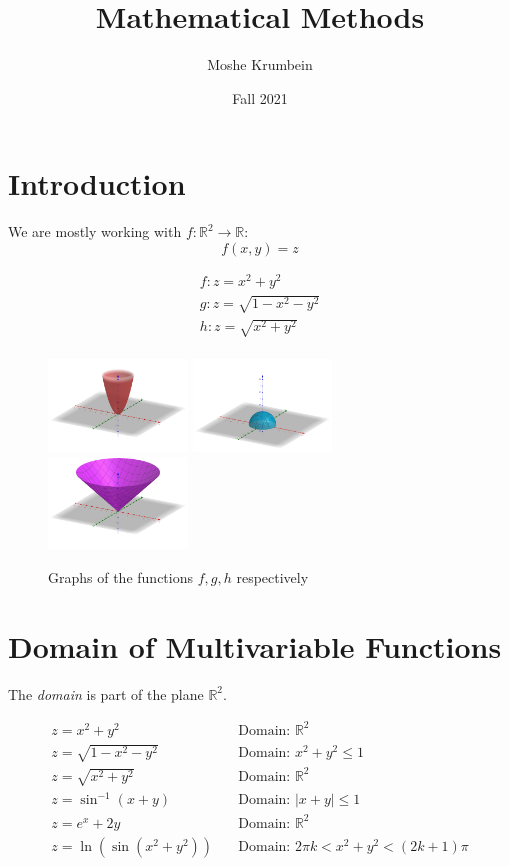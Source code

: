 \documentclass[00_complete]{subfiles}
\title{Mathematical Methods}
\author{Moshe Krumbein}
\date{Fall 2021}
\begin{document}

\section{Introduction}
We are mostly working with $f: \mathbb{R}^2 \to \mathbb{R}$:
$$f(x,y) = z$$
\begin{example}
    \begin{gather*}
     f: z=x^2+y^2 \\
     g: z=\sqrt{1-x^2-y^2} \\
     h: z=\sqrt{x^2+y^2} \\
    \end{gather*}
    \begin{figure}[ht]
    \includegraphics[width=0.33\textwidth]{w10_f}
    \includegraphics[width=0.33\textwidth]{w10_g}
    \includegraphics[width=0.33\textwidth]{w10_h}
    \caption{Graphs of the functions $f,g,h$ respectively}
    \end{figure}
    \label{cone}
\end{example}
\section{Domain of Multivariable Functions}
The \emph{domain} is part of the plane $\mathbb{R}^2$.
\begin{example}
    \begin{align*}
        z=x^2+y^2 &\quad \text{Domain: } \mathbb{R}^2 \\
        z=\sqrt{1-x^2-y^2} &\quad \text{Domain: } x^2+y^2\leq 1 \\
        z=\sqrt{x^2+y^2} &\quad \text{Domain: } \mathbb{R}^2 \\
        z=\sin^{-1}(x+y) &\quad \text{Domain: } |x+y| \leq 1 \\
        z=e^x+2y &\quad \text{Domain: } \mathbb{R}^2 \\
        z=\ln(\sin(x^2+y^2)) &\quad \text{Domain: } 2\pi k < x^2+y^2 <(2k+1)\pi
    \end{align*}
\end{example}
\end{document}
